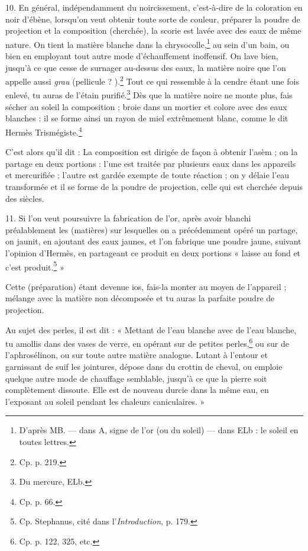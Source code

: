 \documentclass[a4paper, 11pt, oneside, polutonikogreek, french]{article}
\begin{document}
10. En général, indépendamment du noircissement, c'est-à-dire de la coloration en noir d'ébène, lorsqu'on veut obtenir toute sorte de couleur, préparer la poudre de projection et la composition (cherchée), la scorie est lavée avec des eaux de même nature. On tient la matière blanche dans la chrysocolle,\footnote{D'après MB. --- dans A, signe de l'or (ou du soleil) --- dans ELb : le soleil en toutes lettres.} au sein d'un bain, ou bien en employant tout autre mode d'échauffement inoffensif. On lave bien, jusqu'à ce que cesse de surnager au-dessus des eaux, la matière noire que l'on appelle aussi \emph{grau} (pellicule ? ).\footnote{Cp. p. 219.} Tout ce qui ressemble à la cendre étant une fois enlevé, tu auras de l'étain purifié.\footnote{Du mercure, ELb.} Dès que la matière noire ne monte plus, fais sécher au soleil la composition ; broie dans un mortier et colore avec des eaux blanches : il se forme ainsi un rayon de miel extrêmement blanc, comme le dit Hermès Trismégiste.\footnote{Cp. p. 66.}

C'est alors qu'il dit : La composition est dirigée de façon à obtenir l'asèm ; on la partage en deux portions : l'une est traitée par plusieurs eaux dans les appareils et mercurifiée ; l'autre est gardée exempte de toute réaction ; on y délaie l'eau transformée et il se forme de la poudre de projection, celle qui est cherchée depuis des siècles.

11. Si l'on veut poursuivre la fabrication de l'or, après avoir blanchi préalablement les (matières) sur lesquelles on a précédemment opéré un partage, on jaunit, en ajoutant des eaux jaunes, et l'on fabrique une poudre jaune, suivant l'opinion d'Hermès, en partageant ce produit en deux portions « laisse au fond et c'est produit.\footnote{Cp. Stephanus, cité dans l'\emph{Introduction}, p. 179.} »

Cette (préparation) étant devenue ios, fais-la monter au moyen de l'appareil ; mélange avec la matière non décomposée et tu auras la parfaite poudre de projection.

Au sujet des perles, il est dit : « Mettant de l'eau blanche avec de l'eau blanche, tu amollis dans des vases de verre, en opérant sur de petites perles,\footnote{Cp. p. 122, 325, etc.} ou sur de l'aphrosélinon, ou sur toute autre matière analogue. Lutant à l'entour et garnissant de suif les jointures, dépose dans du crottin de cheval, ou emploie quelque autre mode de chauffage semblable, jusqu'à ce que la pierre soit complètement dissoute. Elle est de nouveau durcie dans la même eau, en l'exposant au soleil pendant les chaleurs caniculaires. »
\end{document}
